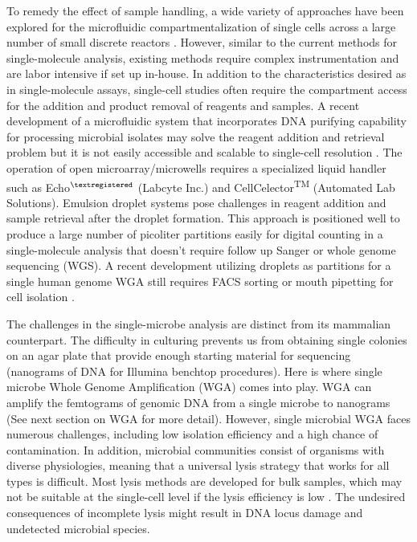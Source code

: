 To remedy the effect of sample handling, a wide variety of approaches have been explored for the microfluidic compartmentalization of single cells across a large number of small discrete reactors \cite{deBourcy:2014ji,Marcy:2007ip}. However, similar to the current methods for single-molecule analysis, existing methods require complex instrumentation and are labor intensive if set up in-house. In addition to the characteristics desired as in single-molecule assays, single-cell studies often require the compartment access for the addition and product removal of reagents and samples. A recent development of a microfluidic system that incorporates DNA purifying capability for processing microbial isolates may solve the reagent addition and retrieval problem but it is not easily accessible and scalable to single-cell resolution \cite{Kim:2017gy}. The operation of open microarray/microwells requires a specialized liquid handler such as Echo$^{\tiny{\textregistered}}$ (Labcyte Inc.) and CellCelector\textsuperscript{TM} (Automated Lab Solutions). Emulsion droplet systems pose challenges in reagent addition and sample retrieval after the droplet formation. This approach is positioned well to produce a large number of picoliter partitions easily for digital counting in a single-molecule analysis that doesn't require follow up Sanger or whole genome sequencing (WGS). A recent development utilizing droplets as partitions for a single human genome WGA still requires FACS sorting or mouth pipetting for cell isolation \cite{Fu:2015gl}. 

The challenges in the single-microbe analysis are distinct from its mammalian counterpart. The difficulty in culturing prevents us from obtaining single colonies on an agar plate that provide enough starting material for sequencing (nanograms of DNA for Illumina benchtop procedures). Here is where single microbe Whole Genome Amplification (WGA) comes into play. WGA can amplify the femtograms of genomic DNA from a single microbe to nanograms (See next section on WGA for more detail). However, single microbial WGA faces numerous challenges, including low isolation efficiency and a high chance of contamination. In addition, microbial communities consist of organisms with diverse physiologies, meaning that a universal lysis strategy that works for all types is difficult. Most lysis methods are developed for bulk samples, which may not be suitable at the single-cell level if the lysis efficiency is low \cite{Blainey:2013dp}. The undesired consequences of incomplete lysis might result in DNA locus damage and undetected microbial species. 

